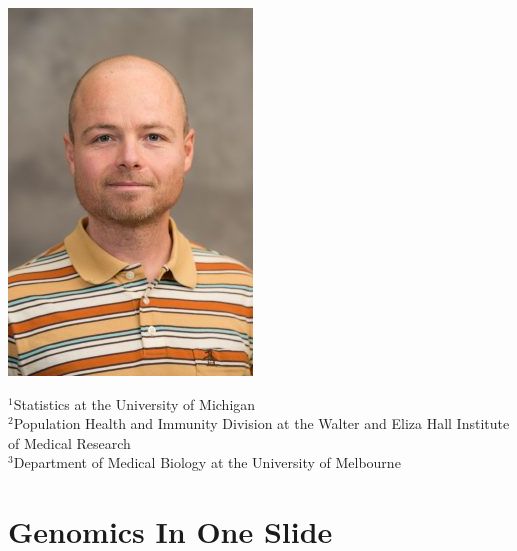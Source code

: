 \documentclass[usenames,dvipsnames,15pt]{beamer}
\begin{document}
\begin{frame}
  \includegraphics[scale=.31]{pictures/johann.jpg}

  \vspace{.25cm}
  {\scriptsize ${}^1$Statistics at the University of Michigan\\
  ${}^2$Population Health and Immunity Division at the Walter and Eliza Hall Institute of Medical Research\\
  ${}^3$Department of Medical Biology at the University of Melbourne}
\end{frame}

\section{Genomics In One Slide}
\end{document}
